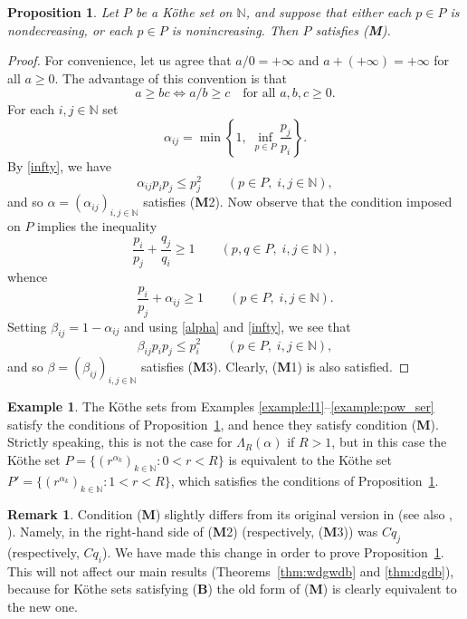 \documentclass[12pt,reqno]{amsart}
\newtheorem{prop}[theorem]{Proposition}
\theoremstyle{definition}
\newtheorem{example}[theorem]{Example}
\newtheorem{remark}[theorem]{Remark}
\begin{document}
\begin{prop}
\label{prop:M_aut}
Let $P$ be a K\"othe set on ${\mathbb N}$, and suppose that
either each $p\in P$ is nondecreasing, or each $p\in P$
is nonincreasing. Then $P$ satisfies {\upshape ({\textbf{M}})}.
\end{prop}
\begin{proof}
For convenience, let us agree that $a/0=+\infty$ and
$a+(+\infty)=+\infty$ for all $a\ge 0$.
The advantage of this convention is that
\begin{equation}
\label{infty}
a\ge bc \iff a/b\ge c \quad\text{for all $a,b,c\ge 0$}.
\end{equation}
For each $i,j\in {\mathbb N}$ set
\[
\alpha_{ij}=\min\left\{ 1,\; \inf_{p\in P} \frac{p_j}{p_i}\right\}.
\]
By \eqref{infty}, we have
\[
\alpha_{ij} p_i p_j\le p_j^2\qquad (p\in P,\; i,j\in {\mathbb N}),
\]
and so $\alpha=(\alpha_{ij})_{i,j\in {\mathbb N}}$ satisfies ({\textbf{M}}2).
Now observe that the condition imposed on $P$ implies the inequality
\[
\frac{p_i}{p_j}+\frac{q_j}{q_i}\ge 1\qquad (p,q\in P,\; i,j\in {\mathbb N}),
\]
whence
\begin{equation}
\label{alpha}
\frac{p_i}{p_j}+\alpha_{ij}\ge 1 \qquad (p\in P,\; i,j\in {\mathbb N}).
\end{equation}
Setting $\beta_{ij}=1-\alpha_{ij}$ and using \eqref{alpha} and \eqref{infty}, we see that
\[
\beta_{ij} p_i p_j\le p_i^2\qquad (p\in P,\; i,j\in {\mathbb N}),
\]
and so $\beta=(\beta_{ij})_{i,j\in {\mathbb N}}$ satisfies ({\textbf{M}}3).
Clearly, ({\textbf{M}}1) is also satisfied.
\end{proof}

\begin{example}
\label{example:M}
The K\"othe sets from Examples \ref{example:l1}--\ref{example:pow_ser}
satisfy the conditions of Proposition~\ref{prop:M_aut},
and hence they satisfy condition ({\textbf{M}}).
Strictly speaking, this is not the case for $\Lambda_R(\alpha)$ if $R>1$,
but in this case the K\"othe set
$P=\{ (r^{\alpha_k})_{k\in{\mathbb N}} : 0<r<R\}$ is equivalent to the K\"othe set
$P'=\{ (r^{\alpha_k})_{k\in{\mathbb N}} : 1<r<R\}$, which satisfies the
conditions of Proposition~\ref{prop:M_aut}.
\end{example}

\begin{remark}
Condition ({\textbf{M}}) slightly differs from its original version
in \cite[4.7]{Pir_bipr} (see also \cite[7.2]{Pir_msb}, \cite[Section 3]{Pir_QJM}).
Namely, in \cite{Pir_bipr,Pir_msb,Pir_QJM} the right-hand side of
({\textbf{M}}2) (respectively, ({\textbf{M}}3)) was $Cq_j$ (respectively, $Cq_i$).
We have made this change in order to prove Proposition~\ref{prop:M_aut}.
This will not affect our main results (Theorems~\ref{thm:wdgwdb}
and \ref{thm:dgdb}), because for K\"othe sets satisfying ({\textbf{B}}) the old
form of ({\textbf{M}}) is clearly equivalent to the new one.
\end{remark}
\end{document}
